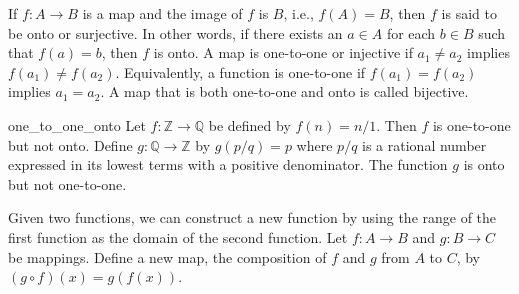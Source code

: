 If $f:A \rightarrow B$ is a map and the image of $f$ is $B$, i.e., $f(A) = B$, then $f$ is said to be {\bfi onto\/} or {\bfi surjective}.  
In other words, if there exists an $a \in A$ for each $b \in B$ such that $f(a) = b$, then $f$ is onto.
A map is {\bfi one-to-one\/} or {\bfi injective\/} if $a_1 \neq a_2$ implies $f(a_1) \neq f(a_2)$.  Equivalently, a function is one-to-one if $f(a_1) = f(a_2)$ implies $a_1 = a_2$.  A map that is both one-to-one and onto is called {\bfi bijective}. %

\begin{example}{one_to_one_onto}
Let $f:{\mathbb Z} \rightarrow {\mathbb Q}$ be defined by $f(n) = n/1$.  Then $f$ is one-to-one but not onto.  Define $g : {\mathbb Q} \rightarrow {\mathbb Z}$ by $g(p/q) = p$ where $p/q$ is a rational number expressed in its lowest terms with a positive denominator.  The function $g$ is onto but not one-to-one. 
\end{example}

Given two functions, we can construct a new function by using the range of the first function as the domain of the second function.  Let $f : A \rightarrow B$ and $g : B \rightarrow C$ be mappings.  Define a new map, the {\bfi composition\/} of $f$ and $g$ from $A$ to $C$, by $(g \circ f)(x) = g(f(x))$.


